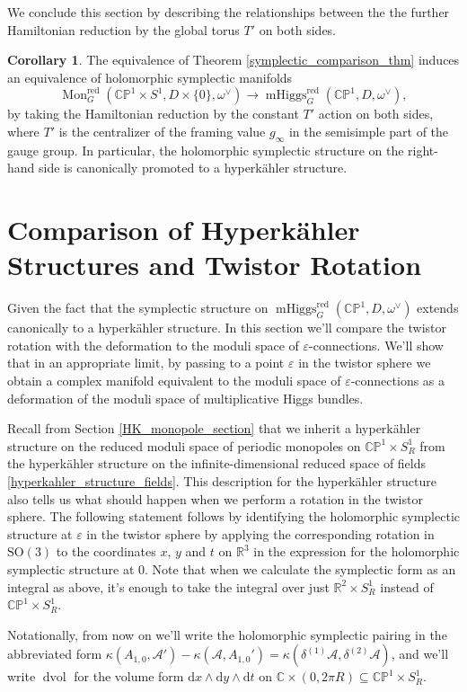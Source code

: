 \documentclass[11pt, oneside, reqno]{amsart}
\theoremstyle{definition} \newtheorem{definition}{Definition}[section]
\newtheorem{corollary}[definition]{Corollary}
\theoremstyle{definition} \newtheorem{remark}[definition]{Remark}
\theoremstyle{definition} \newtheorem{remarks}[definition]{Remarks}
\theoremstyle{definition} \newtheorem{question}[definition]{Question}
\theoremstyle{definition} \newtheorem*{note}{Note}
\theoremstyle{definition} \newtheorem{example}[definition]{Example}
\theoremstyle{definition} \newtheorem{examples}[definition]{Examples}
\newcommand{\bb}[1]{\mathbb{#1}}
\newcommand{\mr}[1]{\mathrm{#1}}
\newcommand{\mc}[1]{\mathcal{#1}}
\newcommand{\CC}{\mathbb{C}}
\newcommand{\RR}{\mathbb{R}}
\newcommand{\eps}{\varepsilon}
\newcommand{\SO}{\mathrm{SO}}
\newcommand{\sub}{\subseteq}
\DeclareMathOperator{\dvol}{dvol}
\DeclareMathOperator{\mhiggs}{mHiggs}
\DeclareMathOperator{\mon}{Mon}
\renewcommand{\d}{\mathrm{d}}
\begin{document}
We conclude this section by describing the relationships between the the further Hamiltonian reduction by the global torus $T'$ on both sides.
\begin{corollary}
The equivalence of Theorem \ref{symplectic_comparison_thm} induces an equivalence of holomorphic symplectic manifolds
\[\mon_G^{\mr{red}}(\bb{CP}^1 \times S^1,D \times\{0\},\omega^\vee) \to \mhiggs_G^{\text{red}}(\bb{CP}^1,D,\omega^\vee),\]
by taking the Hamiltonian reduction by the constant $T'$ action on both sides, where $T'$ is the centralizer of the framing value $g_\infty$ in the semisimple part of the gauge group.  In particular, the holomorphic symplectic structure on the right-hand side is canonically promoted to a hyperk\"ahler structure.
\end{corollary}

\section{Comparison of Hyperk\"ahler Structures and Twistor Rotation} \label{hyperkahler_section}
Given the fact that the symplectic structure on $\mhiggs_G^{\text{red}}(\bb{CP}^1,D,\omega^\vee)$ extends canonically to a hyperk\"ahler structure.  In this section we'll compare the twistor rotation with the deformation to the moduli space of $\eps$-connections. We'll show that in an appropriate limit, by passing to a point $\eps$ in the twistor sphere we obtain a complex manifold equivalent to the moduli space of $\eps$-connections as a deformation of the moduli space of multiplicative Higgs bundles.

Recall from Section \ref{HK_monopole_section} that we inherit a hyperk\"ahler structure on the reduced moduli space of periodic monopoles on $\bb{CP}^1 \times S^1_R$ from the hyperk\"ahler structure on the infinite-dimensional reduced space of fields \ref{hyperkahler_structure_fields}.  This description for the hyperk\"ahler structure also tells us what should happen when we perform a rotation in the twistor sphere.  The following statement follows by identifying the holomorphic symplectic structure at $\eps$ in the twistor sphere by applying the corresponding rotation in $\SO(3)$ to the coordinates $x$, $y$ and $t$ on $\RR^3$ in the expression for the holomorphic symplectic structure at $0$.  Note that when we calculate the symplectic form as an integral as above, it's enough to take the integral over just $\RR^2 \times S^1_R$ instead of $\bb{CP}^1 \times S^1_R$.

Notationally, from now on we'll write the holomorphic symplectic pairing in the abbreviated form $\kappa(A_{1,0}, \mc A') - \kappa(\mc A, A_{1,0}') = \kappa(\delta^{(1)} \mc A, \delta^{(2)} \mc A)$, and we'll write $\dvol$ for the volume form $\d x \wedge \d y \wedge \d t$ on $\CC \times (0,2\pi R)\sub \bb{CP}^1 \times S^1_R$.
\end{document}

